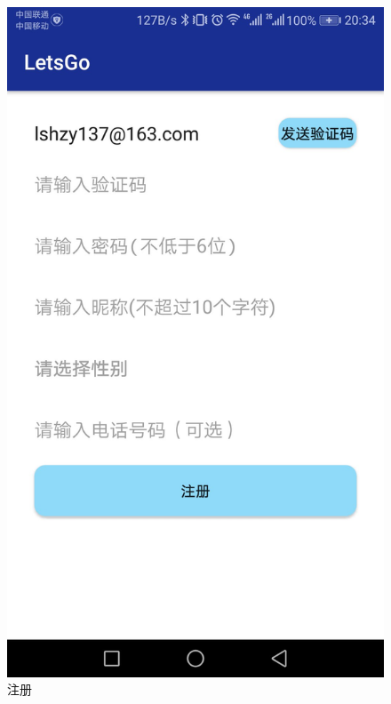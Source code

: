 \documentclass[UTF8]{article}
\begin{document}
\begin{figure}[H]
\begin{minipage}[t]{0.33\textwidth}
    \includegraphics[width=\textwidth]{images/demo_register.jpeg}
    \caption{注册}
\end{minipage}
\begin{minipage}[t]{0.33\textwidth}

\end{minipage}
\end{figure}
\end{document}
